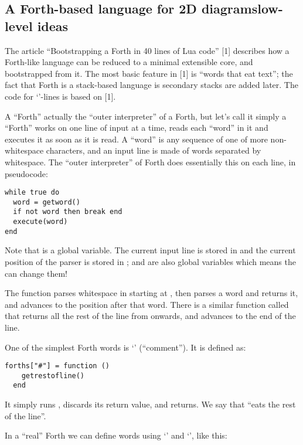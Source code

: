 \documentclass{ltugboat}
\begin{document}
\subsection{A Forth-based language for 2D diagrams\Dash low-level ideas}
\label{2D-low-level}

The article ``Bootstrapping a Forth in 40 lines of Lua code'' [1]
describes how a Forth-like language can be reduced to a minimal
extensible core, and bootstrapped from it. The most basic feature in
[1] is ``words that eat text''; the fact that Forth
is a stack-based language is secondary \Dash stacks are added later. The
code for `'-lines is based on [1].

A ``Forth'' \Dash actually the ``outer interpreter'' of
a Forth, but let's call it simply a ``Forth'' \Dash works on one line of
input at a time, reads each ``word'' in it and executes it as soon as
it is read. A ``word'' is any sequence of one of more non-whitespace
characters, and an input line is made of words separated by
whitespace. The ``outer interpreter'' of Forth does essentially this
on each line, in pseudocode:

\begin{verbatim}
while true do
  word = getword()
  if not word then break end
  execute(word)
end
\end{verbatim}

Note that  is a global variable. The current input line is
stored in  and the current position of the parser is stored
in ;  and  are also global variables \Dash
which means the  can change them!

The function  parses whitespace in  starting at
, then parses a word and returns it, and advances  to
the position after that word. There is a similar function called
 that returns all the rest of the line from
 onwards, and advances  to the end of the line.

One of the simplest Forth words is `\co{\#}' (``comment''). It is
defined as:

\begin{verbatim}
forths["#"] = function ()
    getrestofline()
  end
\end{verbatim}

It simply runs , discards its return value, and
returns. We say that \co{\#} ``eats the rest of the line''.

In a ``real'' Forth we can define words using `\co{:}' and `\co{;}',
like this:
\end{document}

